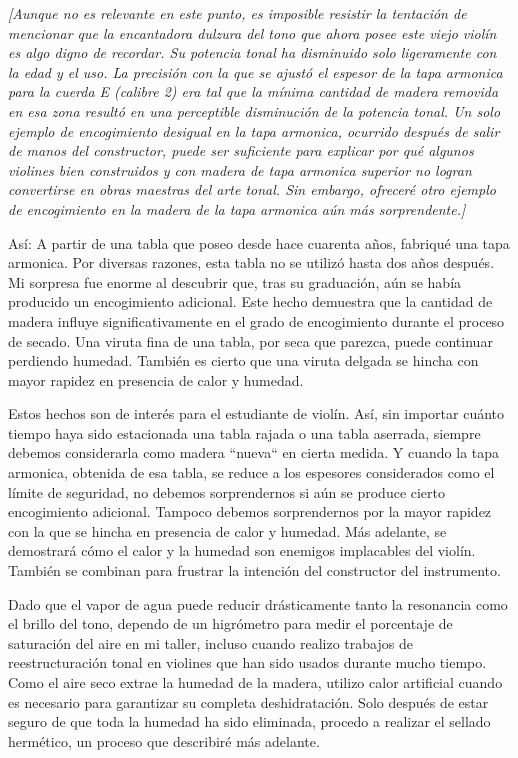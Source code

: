 \documentclass[12pt]{book}
\begin{document}
\textit{[Aunque no es relevante en este punto, es imposible resistir la tentación de mencionar que la encantadora dulzura del tono que ahora posee este viejo violín es algo digno de recordar. Su potencia tonal ha disminuido solo ligeramente con la edad y el uso. La precisión con la que se ajustó el espesor de la tapa armonica para la cuerda E (calibre 2) era tal que la mínima cantidad de madera removida en esa zona resultó en una perceptible disminución de la potencia tonal. Un solo ejemplo de encogimiento desigual en la tapa armonica, ocurrido después de salir de manos del constructor, puede ser suficiente para explicar por qué algunos violines bien construidos y con madera de tapa armonica superior no logran convertirse en obras maestras del arte tonal. Sin embargo, ofreceré otro ejemplo de encogimiento en la madera de la tapa armonica aún más sorprendente.]}

Así: A partir de una tabla que poseo desde hace cuarenta años, fabriqué una tapa armonica. Por diversas razones, esta tabla no se utilizó hasta dos años después. Mi sorpresa fue enorme al descubrir que, tras su graduación, aún se había producido un encogimiento adicional. Este hecho demuestra que la cantidad de madera influye significativamente en el grado de encogimiento durante el proceso de secado. Una viruta fina de una tabla, por seca que parezca, puede continuar perdiendo humedad. También es cierto que una viruta delgada se hincha con mayor rapidez en presencia de calor y humedad. 

Estos hechos son de interés para el estudiante de violín. Así, sin importar cuánto tiempo haya sido estacionada una tabla rajada o una tabla aserrada, siempre debemos considerarla como madera ``nueva`` en cierta medida. Y cuando la tapa armonica, obtenida de esa tabla, se reduce a los espesores considerados como el límite de seguridad, no debemos sorprendernos si aún se produce cierto encogimiento adicional. Tampoco debemos sorprendernos por la mayor rapidez con la que se hincha en presencia de calor y humedad. Más adelante, se demostrará cómo el calor y la humedad son enemigos implacables del violín. También se combinan para frustrar la intención del constructor del instrumento.

Dado que el vapor de agua puede reducir drásticamente tanto la resonancia como el brillo del tono, dependo de un higrómetro para medir el porcentaje de saturación del aire en mi taller, incluso cuando realizo trabajos de reestructuración tonal en violines que han sido usados durante mucho tiempo. Como el aire seco extrae la humedad de la madera, utilizo calor artificial cuando es necesario para garantizar su completa deshidratación. Solo después de estar seguro de que toda la humedad ha sido eliminada, procedo a realizar el sellado hermético, un proceso que describiré más adelante.
\end{document}
